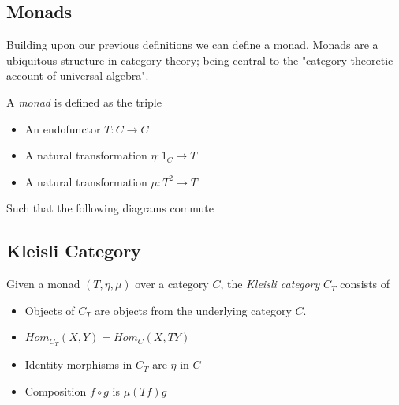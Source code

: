 \subsection{Monads}
Building upon our previous definitions we can define a monad.
Monads are a ubiquitous structure in category theory;
being central to the
"category-theoretic account of universal algebra"\cite{mac2013categories}.\\

\begin{definition}
    A \textit{monad} is defined as the triple
    \begin{itemize}
        \item An endofunctor $T : C \rightarrow C$
        \item A natural transformation $\eta : 1_{C} \rightarrow T$
        \item A natural transformation $\mu : T^2 \rightarrow T$
    \end{itemize}
    Such that the following diagrams commute
    \begin{center}
        \quad
    \end{center}
\end{definition}

\subsection{Kleisli Category}
\begin{definition}
    Given a monad $(T,\eta,\mu)$ over a category $C$,
    the \textit{Kleisli category} $C_T$ consists of
    \begin{itemize}
        \item Objects of $C_T$ are objects from the underlying category $C$.
        \item $Hom_{C_T}(X,Y) = Hom_C (X,TY)$
        \item Identity morphisms in $C_T$ are $\eta$ in $C$
        \item Composition $f \circ g$ is $\mu(Tf)g$
    \end{itemize}
\end{definition}

